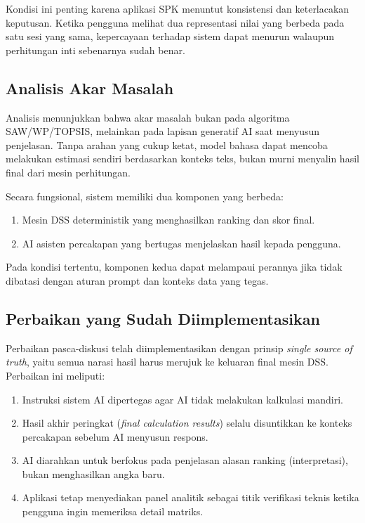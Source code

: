 \documentclass[12pt,a4paper]{article}
\begin{document}
Kondisi ini penting karena aplikasi SPK menuntut konsistensi dan keterlacakan keputusan. Ketika pengguna melihat dua representasi nilai yang berbeda pada satu sesi yang sama, kepercayaan terhadap sistem dapat menurun walaupun perhitungan inti sebenarnya sudah benar.

\subsection{Analisis Akar Masalah}
Analisis menunjukkan bahwa akar masalah bukan pada algoritma SAW/WP/TOPSIS, melainkan pada lapisan generatif AI saat menyusun penjelasan. Tanpa arahan yang cukup ketat, model bahasa dapat mencoba melakukan estimasi sendiri berdasarkan konteks teks, bukan murni menyalin hasil final dari mesin perhitungan.

Secara fungsional, sistem memiliki dua komponen yang berbeda:
\begin{enumerate}
  \item Mesin DSS deterministik yang menghasilkan ranking dan skor final.
  \item AI asisten percakapan yang bertugas menjelaskan hasil kepada pengguna.
\end{enumerate}
Pada kondisi tertentu, komponen kedua dapat melampaui perannya jika tidak dibatasi dengan aturan prompt dan konteks data yang tegas.

\subsection{Perbaikan yang Sudah Diimplementasikan}
Perbaikan pasca-diskusi telah diimplementasikan dengan prinsip \textit{single source of truth}, yaitu semua narasi hasil harus merujuk ke keluaran final mesin DSS. Perbaikan ini meliputi:
\begin{enumerate}
  \item Instruksi sistem AI dipertegas agar AI tidak melakukan kalkulasi mandiri.
  \item Hasil akhir peringkat (\textit{final calculation results}) selalu disuntikkan ke konteks percakapan sebelum AI menyusun respons.
  \item AI diarahkan untuk berfokus pada penjelasan alasan ranking (interpretasi), bukan menghasilkan angka baru.
  \item Aplikasi tetap menyediakan panel analitik sebagai titik verifikasi teknis ketika pengguna ingin memeriksa detail matriks.
\end{enumerate}
\end{document}
